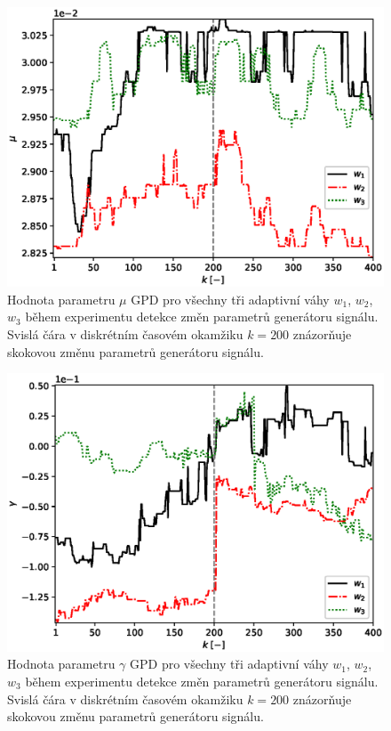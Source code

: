 \begin{figure}[h!]
	\label{fig:par_mu}
	\centering
	\includegraphics[scale=0.71]{IMG/appel_par/par_mu.eps}
	\caption{Hodnota parametru $\mu$ GPD pro všechny tři adaptivní váhy $w_1$, $w_2$, $w_3$ během experimentu detekce změn parametrů generátoru signálu. Svislá čára v diskrétním časovém okamžiku $k=200$ znázorňuje skokovou změnu parametrů generátoru signálu.}
\end{figure}

\begin{figure}[h!]
	\label{fig:par_gamma}
	\centering
	\includegraphics[scale=0.71]{IMG/appel_par/par_gamma.eps}
	\caption{Hodnota parametru $\gamma$ GPD pro všechny tři adaptivní váhy $w_1$, $w_2$, $w_3$ během experimentu detekce změn parametrů generátoru signálu. Svislá čára v diskrétním časovém okamžiku $k=200$ znázorňuje skokovou změnu parametrů generátoru signálu.}
\end{figure}

